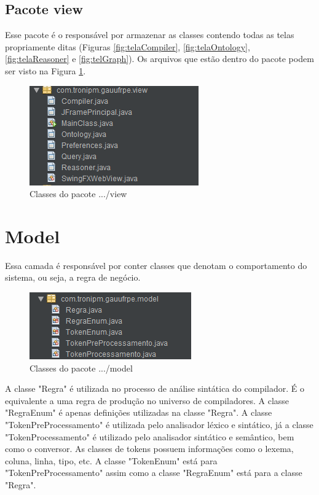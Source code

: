 \documentclass{bcc}
\begin{document}
\subsection{Pacote view}
Esse pacote é o responsável por armazenar as classes contendo todas as telas propriamente ditas (Figuras \ref{fig:telaCompiler}, \ref{fig:telaOntology}, \ref{fig:telaReasoner} e \ref{fig:telGraph}). Os arquivos que estão dentro do pacote podem ser visto na Figura \ref{fig:pacotesView}.
\begin{figure}[H]
\centering
\includegraphics[width=.6\textwidth]{Figuras/pacote_view.png}
\caption{Classes do pacote .../view}
\label{fig:pacotesView}
\end{figure}

\section{Model}

Essa camada é responsável por conter classes que denotam o comportamento do sistema, ou seja, a regra de negócio.
\begin{figure}[H]
\centering
\includegraphics[width=.6\textwidth]{Figuras/pacote_model.png}
\caption{Classes do pacote .../model}
\label{fig:pacotesModel}
\end{figure}

A classe "Regra" é utilizada no processo de análise sintática do compilador. É o equivalente a uma regra de produção no universo de compiladores. A classe "RegraEnum" é apenas definições utilizadas na classe "Regra". A classe "TokenPreProcessamento" é utilizada pelo analisador léxico e sintático, já a classe "TokenProcessamento" é utilizado pelo analisador sintático e semântico, bem como o conversor. As classes de tokens possuem informações como o lexema, coluna, linha, tipo, etc. A classe "TokenEnum" está para "TokenPreProcessamento" assim como a classe "RegraEnum" está para a classe "Regra".
\end{document}
